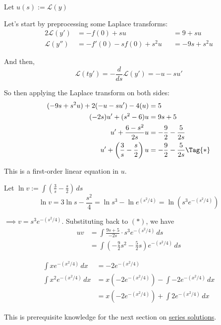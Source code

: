 \begin{compute}
  \def\L{\mathcal L}

  Let $u(s):=\L(y)$

  Let's start by preprocessing some Laplace transforms:
  \begin{alignat*}{2}
    \L(y')  & =-f(0)+su          &  & = 9+su     \\
    \L(y'') & =-f'(0)-sf(0)+s^2u &  & = -9s+s^2u
  \end{alignat*}

  And then,
  $$
    \L(ty')=-\frac{d}{ds}\L(y')=-u-su'
  $$

  So then applying the Laplace transform on both sides:
  \begin{align*}
    (-9s+s^2u)+2(-u-su')-4(u)         &=5                          \\
    (-2s)u'+(s^2-6)u                  &=9s+5                       \\
    u'+\frac{6-s^2}{2s}u              &=-\frac92-\frac5{2s}        \\
    u'+\left(\frac3s-\frac s2\right)u &=-\frac92-\frac5{2s}\Tag{*}
  \end{align*}

  This is a first-order linear equation in $u$.

  Let $\displaystyle\ln v:=\int\left(\frac3s-\frac s2\right)\,ds$
  $$
    \ln v = 3\ln s-\frac{s^2}4
    = \ln s^3-\ln e^{(s^2/4)}
    = \ln (s^3e^{-(s^2/4)})
  $$

  $\implies v=s^3e^{-(s^2/4)}$. Substituting back to $(*)$, we have
  \begin{align*}
    uv &=\int\frac{9s+5}{-2s}\cdot s^3e^{-(s^2/4)}\,ds           \\
       &=\int\left(-\frac92s^2-\frac5{2}s\right)e^{-(s^2/4)}\,ds
  \end{align*}

  \begin{align*}
    \int xe^{-(x^2/4)}\,dx   &= -2e^{-(x^2/4)}                           \\
    \int x^2e^{-(x^2/4)}\,dx &= x(-2e^{-(x^2/4)})-\int-2e^{-(x^2/4)}\,dx \\
                             &= x(-2e^{-(x^2/4)})+\int2e^{-(x^2/4)}\,dx
  \end{align*}
\end{compute}

\label{f490530}

This is prerequisite knowledge for the next section on \href{fdab69a}{series
solutions}.

